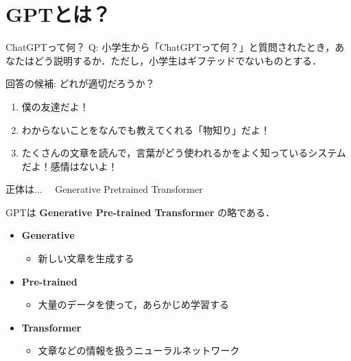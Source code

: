 \documentclass[aspectratio=169,professionalfonts]{beamer}
\begin{document}
\section{GPTとは？}

\begin{frame}{ChatGPTって何？}
  Q: 小学生から「ChatGPTって何？」と質問されたとき，あなたはどう説明するか．ただし，小学生はギフテッドでないものとする．

  \vspace{1em}
  
  回答の候補: \textsf{\large どれが適切だろうか？}
  \begin{enumerate}
    \item 僕の友達だよ！
    \item わからないことをなんでも教えてくれる「物知り」だよ！
    \item たくさんの文章を読んで，言葉がどう使われるかをよく知っているシステムだよ！感情はないよ！
  \end{enumerate}
\end{frame}

\begin{frame}{正体は...}
  \begingroup
  \centering 
  　\textsf{{\Large G}}enerative \textsf{{\Large P}}retrained \textsf{{\Large T}}ransformer 
  \endgroup

GPTは
  \textbf{Generative Pre-trained Transformer}
  の略である．

  \vspace{1em}

  \begin{itemize}
    \item \textbf{Generative}
      \begin{itemize}
        \item 新しい文章を生成する
      \end{itemize}

    \item \textbf{Pre-trained}
      \begin{itemize}
        \item 大量のデータを使って，あらかじめ学習する
      \end{itemize}

    \item \textbf{Transformer}
      \begin{itemize}
        \item 文章などの情報を扱うニューラルネットワーク
      \end{itemize}
  \end{itemize}


\end{frame}
\end{document}
